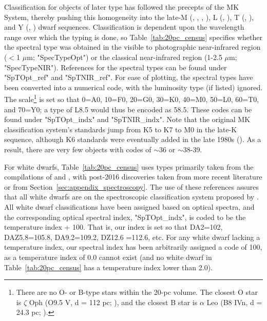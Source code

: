 \documentclass[twocolumn,tighten,twocolappendix]{aastex631}
\begin{document}
Classification for objects of later type has followed the precepts of the MK System, thereby pushing this homogeneity into the late-M (\citealt{boeshaar1976}, \citealt{boeshaar1985}, \citealt{kirkpatrick1991}, \citealt{kirkpatrick2010}), L (\citealt{kirkpatrick1999}, \citealt{kirkpatrick2010}), T (\citealt{burgasser2006}, \citealt{kirkpatrick2010}), and Y (\citealt{cushing2011}, \citealt{kirkpatrick2012}) dwarf sequences. Classification is dependent upon the wavelength range over which the typing is done, so Table~\ref{tab:20pc_census} specifies whether the spectral type was obtained in the visible to photographic near-infrared region ($<$1 $\mu$m; "SpecTypeOpt") or the classical near-infrared region (1-2.5 $\mu$m; "SpecTypeNIR"). References for the spectral types can be found under "SpTOpt\_ref" and "SpTNIR\_ref". For ease of plotting, the spectral types have been converted into a numerical code, with the luminosity type (if listed) ignored. The scale\footnote{There are no O- or B-type stars within the 20-pc volume. The closest O star is $\zeta$ Oph (O9.5 V, d = 112 pc; \citealt{howarth2014, vanleeuwen2007}), and the closest B star is $\alpha$ Leo (B8 IVn, d = 24.3 pc; \citealt{fuhrmann2011b, vanbelle2009, vanleeuwen2007}).} is set so that 0=A0, 10=F0, 20=G0, 30=K0, 40=M0, 50=L0, 60=T0, and 70=Y0; a type of L8.5 would thus be encoded as 58.5. These codes can be found under "SpTOpt\_indx" and "SpTNIR\_indx". Note that the original MK classification system's standards jump from K5 to K7 to M0 in the late-K sequence, although K6 standards were eventually added in the late 1980s (\citealt{keenan1988,keenan1989}). As a result, there are very few objects with codes of $\sim$36 or $\sim$38-39. 

For white dwarfs, Table~\ref{tab:20pc_census} uses types primarily taken from the compilations of \cite{sion2014} and \cite{mccook2016}, with post-2016 discoveries taken from more recent literature or from Section~\ref{sec:appendix_spectroscopy}. The use of these references assures that all white dwarfs are on the spectroscopic classification system proposed by \cite{liebert1994}. All white dwarf classifications have been assigned based on optical spectra, and the corresponding optical spectral index, "SpTOpt\_indx", is coded to be the \cite{liebert1994} temperature index + 100. That is, our index is set so that DA2=102, DAZ5.8=105.8, DA9.2=109.2, DZ12.6 =112.6, etc. For any white dwarf lacking a temperature index, our spectral index has been arbitrarily assigned a code of 100, as a temperature index of 0.0 cannot exist (and no white dwarf in Table~\ref{tab:20pc_census} has a temperature index lower than 2.0).
\end{document}
